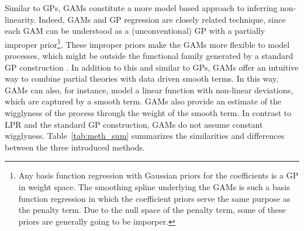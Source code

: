 \documentclass[man, floatsintext]{apa7}
\begin{document}
Similar to GPs, GAMs constitute a more model based approach to inferring
non-linearity. Indeed, GAMs and GP regression are closely related technique,
since each GAM can be understood as a (unconventional) GP with a partially
improper prior\footnote{Any basis function regression with Gaussian priors for
  the coefficients is a GP in weight space. The smoothing spline underlying the
  GAMs is such a basis function regression in which the coefficient priors
  serve
  the same purpose as the penalty term. Due to the null space of the penalty
  term, some of these priors are generally going to be imporper.}. These
improper
priors make the GAMs more flexible to model processes, which might be outside
the functional family generated by a standard GP construction
\parencite{wahba_improper_1978}. In addition to this and similar to GPs, GAMs
offer an intuitive way to combine partial theories with data driven smooth
terms. In this way, GAMs can also, for instance, model a linear function with
non-linear deviations, which are captured by a smooth term. GAMs also provide
an estimate of the wigglyness of the process through the weight of the smooth
term. In contrast to LPR and the standard GP construction, GAMs do not assume
constant wigglyness. Table~\ref{tab:meth_sum} summarizes the similarities and
differences between the three introduced methods.
\end{document}
